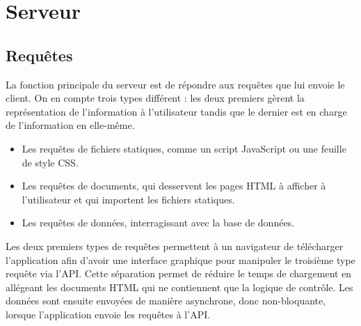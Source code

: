 \documentclass{EPL-master-thesis-covers-FR}
\begin{document}
		\section{Serveur}
			\label{sec:serveur}



			\subsection{Requêtes}

				La fonction principale du serveur est de répondre aux requêtes que lui envoie le client. On en compte trois types différent : les deux premiers gèrent la représentation de l'information à l'utilisateur tandis que le dernier est en charge de l'information en elle-même.

				\begin{itemize}
					\item Les requêtes de fichiers statiques, comme un script JavaScript ou une feuille de style CSS.
					\item Les requêtes de documents, qui desservent les pages HTML à afficher à l'utilisateur et qui importent les fichiers statiques.
					\item Les requêtes de données, interragissant avec la base de données.
				\end{itemize}



				Les deux premiers types de requêtes permettent à un navigateur de télécharger l'application afin d'avoir une interface graphique pour manipuler le troisième type requête via l'API. Cette séparation permet de réduire le temps de chargement en allégeant les documents HTML qui ne contiennent que la logique de contrôle. Les données sont ensuite envoyées de manière asynchrone, donc non-bloquante, lorsque l'application envoie les requêtes à l'API.
\end{document}

